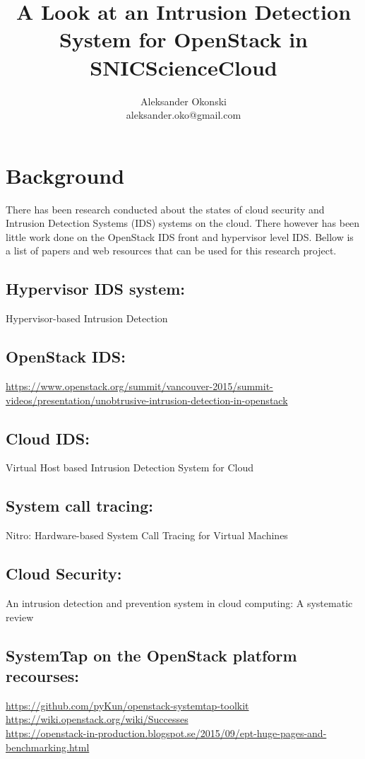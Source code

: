 \documentclass[12pt]{article}
\title{A Look at an Intrusion Detection System for OpenStack in SNICScienceCloud}
\author{Aleksander Okonski \\ aleksander.oko@gmail.com}
\date{}
\begin{document}
\maketitle

\section{Background}
There has been research conducted about the states of cloud security and Intrusion Detection Systems (IDS) systems on the cloud. There however has been little work done on the OpenStack IDS front and hypervisor level IDS\@. Bellow is a list of papers and web resources  that can be used for this research project.

\subsection{Hypervisor IDS system:}
Hypervisor-based Intrusion Detection

\subsection{OpenStack IDS:}
\url{https://www.openstack.org/summit/vancouver-2015/summit-videos/presentation/unobtrusive-intrusion-detection-in-openstack}

\subsection{Cloud IDS:}
Virtual Host based Intrusion Detection System for Cloud

\subsection{System call tracing:}
Nitro: Hardware-based System Call Tracing for Virtual Machines

\subsection{Cloud Security:}
An intrusion detection and prevention system in cloud computing: A systematic review

\subsection{SystemTap on the OpenStack platform recourses:}
\url{https://github.com/pyKun/openstack-systemtap-toolkit}
\\
\url{https://wiki.openstack.org/wiki/Successes}
\\
\url{https://openstack-in-production.blogspot.se/2015/09/ept-huge-pages-and-benchmarking.html}
\end{document}
